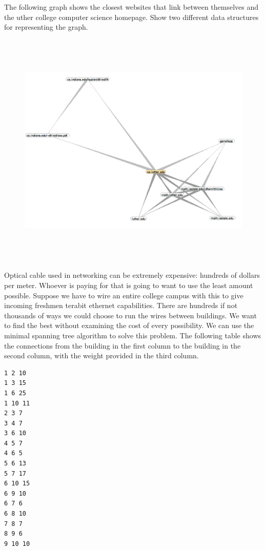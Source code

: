 \documentclass[11pt,letter]{exam}
\begin{document}
\begin{questions}
\newpage
\question[20]
The following graph shows the closest websites that link between themselves and
the uther college computer science homepage.  Show two different data structures for
representing the graph.
\begin{figure}[h]
  \centering
  \includegraphics[height=4.5in]{cs-graph.pdf}
\end{figure}

\newpage
\question
Optical cable used in networking can be extremely expensive: hundreds of dollars
per meter. Whoever is paying for that is going to want to use the least amount
possible. Suppose we have to wire an entire college campus with this to give
incoming freshmen terabit ethernet capabilities. There are hundreds if not
thousands of ways we could choose to run the wires between buildings. We want to
find the best without examining the cost of every possibility.  We can use the
minimal spanning tree algorithm to solve this problem.  The following table
shows the connections from the building in the first column to the building in
the second column, with the weight provided in the third column.
\begin{verbatim}
1 2 10
1 3 15
1 6 25
1 10 11
2 3 7
3 4 7
3 6 10
4 5 7
4 6 5
5 6 13
5 7 17
6 10 15
6 9 10
6 7 6
6 8 10
7 8 7
8 9 6
9 10 10
\end{verbatim}
\end{questions}
\end{document}
